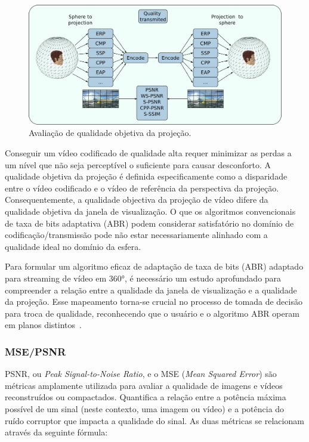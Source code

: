 \begin{figure}[h]
        \centering
        \includegraphics[width=0.7\linewidth]{fig/diagrama e qualidade 1.png}
        \caption{Avaliação de qualidade objetiva da projeção.}
        \label{fig:QualityDiagram}
\end{figure}

Conseguir um vídeo codificado de qualidade alta requer minimizar as perdas a um nível que não seja perceptível o suficiente para causar desconforto. A qualidade objetiva da projeção é definida especificamente como a disparidade entre o vídeo codificado e o vídeo de referência da perspectiva da projeção. Consequentemente, a qualidade objectiva da projeção de vídeo difere da qualidade objetiva da janela de visualização. O que os algoritmos convencionais de taxa de bits adaptativa (ABR) podem considerar satisfatório no domínio de codificação/transmissão pode não estar necessariamente alinhado com a qualidade ideal no domínio da esfera.

Para formular um algoritmo eficaz de adaptação de taxa de bits (ABR) adaptado para streaming de vídeo em 360°, é necessário um estudo aprofundado para compreender a relação entre a qualidade da janela de visualização e a qualidade da projeção. Esse mapeamento torna-se crucial no processo de tomada de decisão para troca de qualidade, reconhecendo que o usuário e o algoritmo ABR operam em planos distintos~\cite{tran2017, Xu2020}.

\subsubsection{MSE/PSNR}

PSNR, ou \textit{Peak Signal-to-Noise Ratio}, e o MSE (\textit{Mean Squared Error}) são métricas amplamente utilizada para avaliar a qualidade de imagens e vídeos reconstruídos ou compactados. Quantifica a relação entre a potência máxima possível de um sinal (neste contexto, uma imagem ou vídeo) e a potência do ruído corruptor que impacta a qualidade do sinal. As duas métricas se relacionam através da seguinte fórmula:

